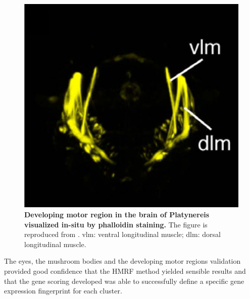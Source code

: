 		
	\begin{figure}[h]
\centerline{\includegraphics[width=0.6\linewidth]{gfx/chapter6/muscle_stain.png}}
\caption{{\bf Developing motor region in the brain of Platynereis visualized in-situ by phalloidin staining.} The figure is reproduced from \cite{Fiscer10}. vlm: ventral longitudinal muscle; dlm: dorsal longitudinal muscle.}
\label{fig:muscles_stain}
	\end{figure}
	
	The eyes, the mushroom bodies and the developing motor regions validation provided good confidence that the HMRF method yielded sensible results and that the gene scoring developed was able to successfully define a specific gene expression fingerprint for each cluster. 


